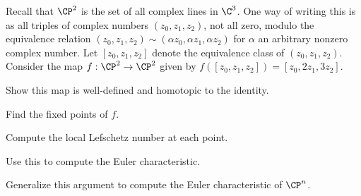 Recall that $\CP^2$ is the set of all complex lines in $\C^3$. One way
of writing this is as all triples of complex numbers $(z_0,z_1,z_2)$,
not all zero, modulo the equivalence relation $(z_0,z_1,z_2)\sim
(\alpha z_0,\alpha z_1,\alpha z_2)$ for $\alpha$ an arbitrary nonzero
complex number. Let $[z_0,z_1,z_2]$ denote the equivalence class of
$(z_0,z_1,z_2)$. Consider the map $f:\CP^2\rightarrow \CP^2$ given by
$f([z_0,z_1,z_2])=[z_0,2z_1,3z_2]$.
\begin{alist}
\item Show this map is well-defined and homotopic to the identity.
\item Find the fixed points of $f$.
\item Compute the local Lefschetz number at each point.
\item Use this to compute the Euler characteristic.
\item Generalize this argument to compute the Euler characteristic of
$\CP^n$.
\end{alist}
